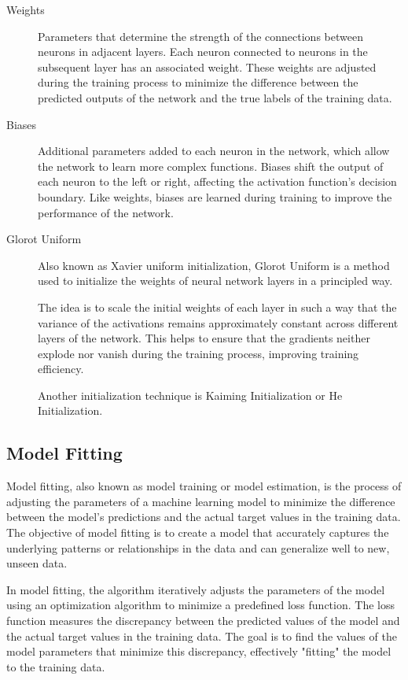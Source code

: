 \documentclass[a4paper]{article}
\begin{document}
\begin{description}
\item[Weights]
Parameters that determine the strength of the connections between neurons in adjacent layers. Each neuron connected to neurons in the subsequent layer has an associated weight. These weights are adjusted during the training process to minimize the difference between the predicted outputs of the network and the true labels of the training data.

\item[Biases]
Additional parameters added to each neuron in the network, which allow the network to learn more complex functions. Biases shift the output of each neuron to the left or right, affecting the activation function's decision boundary. Like weights, biases are learned during training to improve the performance of the network.

\item[Glorot Uniform]
Also known as Xavier uniform initialization, Glorot Uniform is a method used to initialize the weights of neural network layers in a principled way. 

The idea is to scale the initial weights of each layer in such a way that the variance of the activations remains approximately constant across different layers of the network. This helps to ensure that the gradients neither explode nor vanish during the training process, improving training efficiency.

Another initialization technique is Kaiming Initialization or He Initialization.
\end{description}


\subsection*{Model Fitting}
Model fitting, also known as model training or model estimation, is the process of adjusting the parameters of a machine learning model to minimize the difference between the model's predictions and the actual target values in the training data. The objective of model fitting is to create a model that accurately captures the underlying patterns or relationships in the data and can generalize well to new, unseen data.

In model fitting, the algorithm iteratively adjusts the parameters of the model using an optimization algorithm to minimize a predefined loss function. The loss function measures the discrepancy between the predicted values of the model and the actual target values in the training data. The goal is to find the values of the model parameters that minimize this discrepancy, effectively "fitting" the model to the training data.
\end{document}
